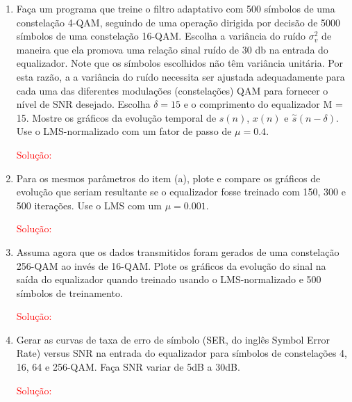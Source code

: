 \documentclass[a4paper,10pt]{article}
\begin{document}
\begin{enumerate}
				\begin{enumerate}
					
					\item Faça um programa que treine o ﬁltro adaptativo com 500 símbolos de uma constelação 4-QAM, seguindo de uma operação dirigida por decisão de 5000 símbolos de uma constelação 16-QAM. Escolha a variância do ruído $\sigma^{2}_{v}$ de maneira que ela promova uma relação sinal ruído de 30 db na entrada do equalizador. Note que os símbolos escolhidos não têm variância unitária. Por esta razão, a a variância do ruído necessita ser ajustada adequadamente para cada uma das diferentes modulações (constelações) QAM para fornecer o nível de SNR desejado. Escolha $\delta = 15$ e o comprimento do equalizador M = 15. Mostre os gráﬁcos da evolução temporal de $s(n)$, $x(n)$ e $\overset{\sim}{s}(n - \delta)$. Use o LMS-normalizado com um fator de passo de $\mu = 0.4$.
								
						\textcolor{red}{Solução:}

					\item Para os mesmos parâmetros do item (a), plote e compare os gráﬁcos de evolução que seriam resultante se o equalizador fosse treinado com 150, 300 e 500 iterações. Use o LMS com um
					$\mu = 0.001$.
					
						\textcolor{red}{Solução:}

					\item Assuma agora que os dados transmitidos foram gerados de uma constelação 256-QAM ao invés de 16-QAM. Plote os gráﬁcos da evolução do sinal na saída do equalizador quando treinado
					usando o LMS-normalizado e 500 símbolos de treinamento.					
					
						\textcolor{red}{Solução:}

					\item Gerar as curvas de taxa de erro de símbolo (SER, do inglês Symbol Error Rate) versus SNR na entrada do equalizador para símbolos de constelações 4, 16, 64 e 256-QAM. Faça SNR variar
					de 5dB a 30dB.
					
						\textcolor{red}{Solução:}

				\end{enumerate}
				

\end{enumerate}
\end{document}
